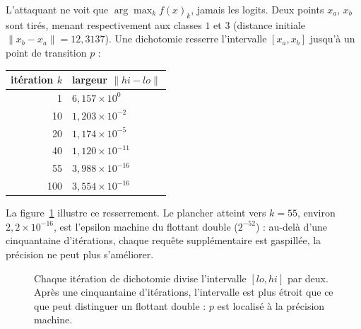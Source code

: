 \documentclass[11pt]{article}
\begin{document}
L'attaquant ne voit que $\arg\max_k f(x)_k$, jamais les logits. Deux points
$x_a$, $x_b$ sont tirés, menant respectivement aux classes $1$ et $3$
(distance initiale $\|x_b - x_a\| = 12{,}3137$). Une dichotomie resserre
l'intervalle $[x_a, x_b]$ jusqu'à un point de transition $p$ :

\begin{center}
\begin{tabular}{rl}
\toprule
itération $k$ & largeur $\|hi - lo\|$ \\
\midrule
1   & $6{,}157 \times 10^{0}$ \\
10  & $1{,}203 \times 10^{-2}$ \\
20  & $1{,}174 \times 10^{-5}$ \\
40  & $1{,}120 \times 10^{-11}$ \\
55  & $3{,}988 \times 10^{-16}$ \\
100 & $3{,}554 \times 10^{-16}$ \\
\bottomrule
\end{tabular}
\end{center}

La figure~\ref{fig:bisection} illustre ce resserrement. Le plancher atteint
vers $k=55$, environ $2{,}2 \times 10^{-16}$, est l'epsilon machine du
flottant double ($2^{-52}$) : au-delà d'une cinquantaine d'itérations,
chaque requête supplémentaire est gaspillée, la précision ne peut plus
s'améliorer.

\begin{figure}[h]
\centering
{}
\caption{Chaque itération de dichotomie divise l'intervalle $[lo,hi]$ par
deux. Après une cinquantaine d'itérations, l'intervalle est plus étroit que
ce que peut distinguer un flottant double : $p$ est localisé à la précision
machine.}
\label{fig:bisection}
\end{figure}
\end{document}
